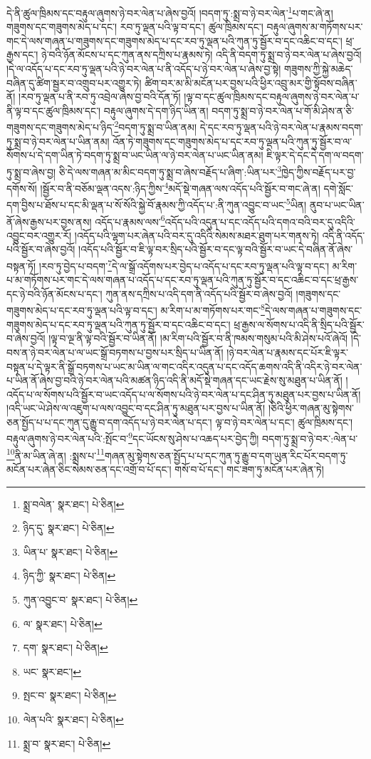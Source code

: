 དེ་ནི་ཚུལ་ཁྲིམས་དང་བརྟུལ་ཞུགས་ཉེ་བར་ལེན་པ་ཞེས་བྱའོ། །བདག་ཏུ་:སྨྲ་བ་ཉེ་བར་ལེན་\footnote{སྨྲ་བལེན་  སྣར་ཐང་།  པེ་ཅིན། }པ་གང་ཞེ་ན། གཟུགས་དང་གཟུགས་མེད་པ་དང་། རབ་ཏུ་ལྡན་པའི་ལྟ་བ་དང་། ཚུལ་ཁྲིམས་དང་། བརྟུལ་ཞུགས་མ་གཏོགས་པར་གང་དེ་ལས་གཞན་པ་གཟུགས་དང་གཟུགས་མེད་པ་དང་རབ་ཏུ་ལྡན་པའི་ཀུན་ཏུ་སྦྱོར་བ་དང་འཆིང་བ་དང་། ཕྲ་རྒྱས་དང་། ཉེ་བའི་ཉོན་མོངས་པ་དང་ཀུན་ནས་དཀྲིས་པ་རྣམས་ཏེ། འདི་ནི་བདག་ཏུ་སྨྲ་བ་ཉེ་བར་ལེན་པ་ཞེས་བྱའོ། །དེ་ལ་འདོད་པ་དང་རབ་ཏུ་ལྡན་པའི་ཉེ་བར་ལེན་པ་ནི་འདོད་པ་ཉེ་བར་ལེན་པ་ཞེས་བྱ་སྟེ། གཟུགས་ཀྱི་སྐྱེ་མཆེད་བཞིན་དུ་ཚིག་སྦྱར་བ་འགྲུབ་པར་འགྱུར་ཏེ། ཚིག་བར་མ་མི་མངོན་པར་བྱས་པའི་ཕྱིར་འབྲུ་མར་གྱི་སྟོབས་བཞིན་ནོ། །རབ་ཏུ་ལྡན་པ་ནི་རབ་ཏུ་འབྲེལ་ཞེས་བྱ་བའི་དོན་ཏོ། །ལྟ་བ་དང་ཚུལ་ཁྲིམས་དང་བརྟུལ་ཞུགས་ཉེ་བར་ལེན་པ་ནི་ལྟ་བ་དང་ཚུལ་ཁྲིམས་དང་། བརྟུལ་ཞུགས་དེ་དག་ཉིད་ཡིན་ན། བདག་ཏུ་སྨྲ་བ་ཉེ་བར་ལེན་པ་གོ་མི་ཤེས་ན་ཅི་གཟུགས་དང་གཟུགས་མེད་པ་ཉིད་\footnote{ཉིད་དུ་  སྣར་ཐང་།  པེ་ཅིན། }བདག་ཏུ་སྨྲ་བ་ཡིན་ནམ། དེ་དང་རབ་ཏུ་ལྡན་པའི་ཉེ་བར་ལེན་པ་རྣམས་བདག་ཏུ་སྨྲ་བ་ཉེ་བར་ལེན་པ་ཡིན་ནམ། འོན་ཏེ་གཟུགས་དང་གཟུགས་མེད་པ་དང་རབ་ཏུ་ལྡན་པའི་ཀུན་ཏུ་སྦྱོར་བ་ལ་སོགས་པ་དེ་དག་ཡིན་ཏེ་བདག་ཏུ་སྨྲ་བ་ཡང་ཡིན་ལ་ཉེ་བར་ལེན་པ་ཡང་ཡིན་ནམ། ཇི་ལྟར་དེ་དང་དེ་དག་ལ་བདག་ཏུ་སྨྲ་བ་ཞེས་བྱ། ཅི་དེ་ལས་གཞན་མ་མིང་བདག་ཏུ་སྨྲ་བ་ཞེས་བརྗོད་པ་ཞིག་:ཡིན་པར་\footnote{ཡིན་པ་  སྣར་ཐང་།  པེ་ཅིན། }ཁྱེད་ཀྱིས་བརྗོད་པར་བྱ་དགོས་སོ། །སྦྱོར་བ་ནི་བཅོམ་ལྡན་འདས་:ཉིད་ཀྱིས་\footnote{ཉིད་ཀྱི་  སྣར་ཐང་།  པེ་ཅིན། }མདོ་སྡེ་གཞན་ལས་འདོད་པའི་སྦྱོར་བ་གང་ཞེ་ན། དགེ་སློང་དག་བྱིས་པ་ཐོས་པ་དང་མི་ལྡན་པ་སོ་སོའི་སྐྱེ་བོ་རྣམས་ཀྱི་འདོད་པ་:ནི་ཀུན་འབྱུང་བ་ཡང་\footnote{ཀུན་འབྱུང་བ་  སྣར་ཐང་།  པེ་ཅིན། }ཡིན། ནུབ་པ་ཡང་ཡིན་ནོ་ཞེས་རྒྱས་པར་བྱས་ནས། འདོད་པ་རྣམས་ལས་\footnote{ལ་  སྣར་ཐང་།  པེ་ཅིན། }འདོད་པའི་འདུན་པ་དང་འདོད་པའི་དགའ་བའི་བར་དུ་འདིའི་འབྱུང་བར་འགྱུར་རོ། །འདོད་པའི་ལྷག་པར་ཞེན་པའི་བར་དུ་འདིའི་སེམས་མཐར་ཐུག་པར་གནས་ཏེ། འདི་ནི་འདོད་པའི་སྦྱོར་བ་ཞེས་བྱའོ། །འདོད་པའི་སྦྱོར་བ་ཇི་ལྟ་བར་སྲིད་པའི་སྦྱོར་བ་དང་ལྟ་བའི་སྦྱོར་བ་ཡང་དེ་བཞིན་ནོ་ཞེས་བསྟན་ཏོ། །རབ་ཏུ་བྱེད་པ་བདག་\footnote{དག་  སྣར་ཐང་།  པེ་ཅིན། }དེ་ལ་སྒྲོ་འདོགས་པར་བྱེད་པ་འདོད་པ་དང་རབ་ཏུ་ལྡན་པའི་ལྟ་བ་དང་། མ་རིག་པ་མ་གཏོགས་པར་གང་དེ་ལས་གཞན་པ་འདོད་པ་དང་རབ་ཏུ་ལྡན་པའི་ཀུན་ཏུ་སྦྱོར་བ་དང་འཆིང་བ་དང་ཕྲ་རྒྱས་དང་ཉེ་བའི་ཉོན་མོངས་པ་དང་། ཀུན་ནས་དཀྲིས་པ་འདི་དག་ནི་འདོད་པའི་སྦྱོར་བ་ཞེས་བྱའོ། །གཟུགས་དང་གཟུགས་མེད་པ་དང་རབ་ཏུ་ལྡན་པའི་ལྟ་བ་དང་། མ་རིག་པ་མ་གཏོགས་པར་གང་\footnote{ཡང་  སྣར་ཐང་། }དེ་ལས་གཞན་པ་གཟུགས་དང་གཟུགས་མེད་པ་དང་རབ་ཏུ་ལྡན་པའི་ཀུན་ཏུ་སྦྱོར་བ་དང་འཆིང་བ་དང་། ཕྲ་རྒྱས་ལ་སོགས་པ་འདི་ནི་སྲིད་པའི་སྦྱོར་བ་ཞེས་བྱའོ། །ལྟ་བ་ལྔ་ནི་ལྟ་བའི་སྦྱོར་བ་ཡིན་ནོ། །མ་རིག་པའི་སྦྱོར་བ་ནི་ཁམས་གསུམ་པའི་མི་ཤེས་པའོ་ཞེའོ། །དེ་བས་ན་ཉེ་བར་ལེན་པ་ལ་ཡང་སྒྲོ་བཏགས་པ་བྱས་པར་སྲིད་པ་ཡིན་ནོ། །ཉེ་བར་ལེན་པ་རྣམས་དང་པོར་ཇི་ལྟར་བསྟན་པ་དེ་ལྟར་ནི་སྒྲོ་བཏགས་པ་ཡང་མ་ཡིན་ལ་གང་འདིར་འདུན་པ་དང་འདོད་ཆགས་འདི་ནི་འདིར་ཉེ་བར་ལེན་པ་ཡིན་ནོ་ཞེས་བྱ་བའི་ཉེ་བར་ལེན་པའི་མཚན་ཉིད་འདི་ནི་མདོ་སྡེ་གཞན་དང་ཡང་རྗེས་སུ་མཐུན་པ་ཡིན་ནོ། །འདོད་པ་ལ་སོགས་པའི་སྦྱོར་བ་ཡང་འདོད་པ་ལ་སོགས་པའི་ཉེ་བར་ལེན་པ་དང་ཤིན་ཏུ་མཐུན་པར་བྱས་པ་ཡིན་ནོ། །འདི་ཡང་ཡེ་ཤེས་ལ་འཇུག་པ་ལས་འབྱུང་བ་དང་ཤིན་ཏུ་མཐུན་པར་བྱས་པ་ཡིན་ནོ། །ཅིའི་ཕྱིར་གཞན་མུ་སྟེགས་ཅན་སྤྱོད་པ་པ་དང་ཀུན་དུ་རྒྱུ་བ་དག་འདོད་པ་ཉེ་བར་ལེན་པ་དང་། ལྟ་བ་ཉེ་བར་ལེན་པ་དང་། ཚུལ་ཁྲིམས་དང་། བརྟུལ་ཞུགས་ཉེ་བར་ལེན་པའི་:སྤོང་བ་\footnote{སྤང་བ་  སྣར་ཐང་།  པེ་ཅིན། }དང་ཡོངས་སུ་ཤེས་པ་འཆད་པར་བྱེད་ཀྱི། བདག་ཏུ་སྨྲ་བ་ཉེ་བར་:ལེན་པ་\footnote{ལེན་པའི་  སྣར་ཐང་།  པེ་ཅིན། }ནི་མ་ཡིན་ཞེ་ན། :སྨྲས་པ་\footnote{སྨྲ་བ་  སྣར་ཐང་།  པེ་ཅིན། }གཞན་མུ་སྟེགས་ཅན་སྤྱོད་པ་པ་དང་ཀུན་ཏུ་རྒྱུ་བ་དག་ཡུན་རིང་པོར་བདག་ཏུ་མངོན་པར་ཞེན་ཅིང་སེམས་ཅན་དང་འགྲོ་བ་པོ་དང་། གསོ་བ་པོ་དང་། གང་ཟག་ཏུ་མངོན་པར་ཞེན་ཏེ། 